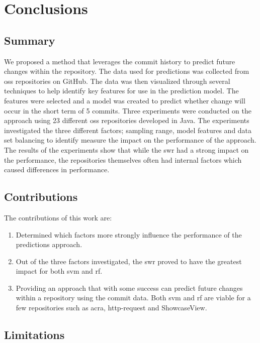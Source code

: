 \chapter{Conclusions}
\label{chap:conclusions}

\section{Summary}

We proposed a method that leverages the commit history to predict future changes within the repository. The data used for predictions was collected from \gls{oss} repositories on GitHub. The data was then visualized through several techniques to help identify key features for use in the prediction model. The features were selected and a model was created to predict whether change will occur in the short term of 5 commits. Three experiments were conducted on the approach using 23 different \gls{oss} repositories developed in Java. The experiments investigated the three different factors; sampling range, model features and data set balancing to identify measure the impact on the performance of the approach. The results of the experiments show that while the \gls{swr} had a strong impact on the performance, the repositories themselves often had internal factors which caused differences in performance.

\section{Contributions}

The contributions of this work are:
\begin{enumerate}
\item Determined which factors more strongly influence the performance of the predictions approach.
\item Out of the three factors investigated, the \gls{swr} proved to have the greatest impact for both \gls{svm} and \gls{rf}.
\item Providing an approach that with some success can predict future changes within a repository using the commit data. Both \gls{svm} and \gls{rf} are viable for a few repositories such as acra, http-request and ShowcaseView.
\end{enumerate}

\section{Limitations}

